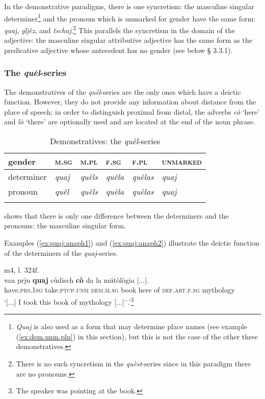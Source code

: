 In the demonstrative paradigms, there is one syncretism: the masculine singular determiner\footnote{\textit{Quaj} is also used as a form that may determine place names (see example (\ref{ex:dem.unm.pln}) in this section), but this is not the case of the other three demonstratives.} and the pronoun which is unmarked for gender have the same form: \textit{quaj}, \textit{gljèz}, and \textit{tschaj}.\footnote{There is no such syncretism in the \textit{quèst}-series since in this paradigm there are no pronouns.} This parallels the syncretism in the domain of the adjective: the masculine singular attributive adjective has the same form as the predicative adjective whose antecedent has no gender (see below § 3.3.1).

\subsubsection{The \textit{quèl}-series}

The demonstratives of the \textit{quèl}-series are the only ones which have a deictic function. However, they do not provide any information about distance from the place of speech; in order to distinguish proximal from distal, the adverbs \textit{cò} `here' and \textit{lò} `there' are optionally used and are located at the end of the noun phrase.

\begin{table}
\caption{Demonstratives: the \textit{quèl}-series}
\label{demquel}
 \begin{tabular}{llllll}
  \lsptoprule
   gender         & \textsc{m.sg} & \textsc{m.pl} & \textsc{f.sg} & \textsc{f.pl} & \textsc{unmarked}\\
  \midrule
  determiner  & \textit{quaj} &  \textit{quèls}  & \textit{quèla}  & \textit{quèlas} & \textit{quaj}\\
  pronoun  & \textit{quèl} & \textit{quèls} & \textit{quèla} & \textit{quèlas} & \textit{quaj}\\
  \lspbottomrule
 \end{tabular}
\end{table}

 shows that there is only one difference between the determiners and the pronouns: the masculine singular form. 


Examples (\ref{ex:quaj:anaph1}) and (\ref{ex:quaj:anaph2}) illustrate the deictic function of the determiners of the \textit{quaj}-series.

\ea
\label{ex:quaj:anaph1}
 {m4, l. 324f.}\\
\gll [...] vau prju \textbf{quaj} cùdisch \textbf{cò} da la mütòlògia [...].\\
{} have.\textsc{prs.1sg} take.\textsc{ptcp.unm} \textsc{dem.m.sg} book here of \textsc{def.art.f.sg} mythology\\
\glt `[...] I took this book of mythology [...]¨.'\footnote{The speaker was pointing at the book.}
\z

